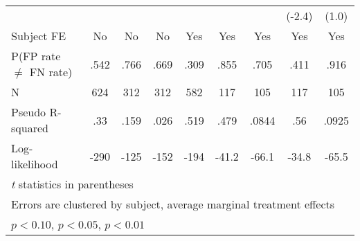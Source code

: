 \begin{table}[htbp]
\begin{tabular}{l*{8}{c}}
                &                  &                  &                  &                  &                  &                  &   (-2.4)         &    (1.0)         \\
Subject FE      &       No         &       No         &       No         &      Yes         &      Yes         &      Yes         &      Yes         &      Yes         \\
\hline
P(FP rate $\neq$ FN rate)&     .542         &     .766         &     .669         &     .309         &     .855         &     .705         &     .411         &     .916         \\
N               &      624         &      312         &      312         &      582         &      117         &      105         &      117         &      105         \\
Pseudo R-squared&      .33         &     .159         &     .026         &     .519         &     .479         &    .0844         &      .56         &    .0925         \\
Log-likelihood  &     -290         &     -125         &     -152         &     -194         &    -41.2         &    -66.1         &    -34.8         &    -65.5         \\
\hline\hline
\multicolumn{9}{l}{\footnotesize \textit{t} statistics in parentheses}\\
\multicolumn{9}{l}{\footnotesize Errors are clustered by subject, average marginal treatment effects}\\
\multicolumn{9}{l}{\footnotesize \sym{*} \(p<0.10\), \sym{**} \(p<0.05\), \sym{***} \(p<0.01\)}\\
\end{tabular}
\end{table}
